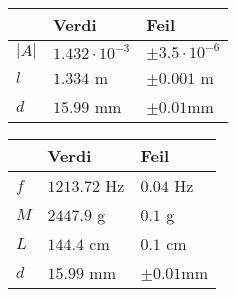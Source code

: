 \documentclass{article}
\begin{document}
\begin{table}
	\center 
	\begin{tabular}{|l|l|l|}
	  \hline
	   & Verdi & Feil \\ \hline
	  $|A|$ & $1.432\cdot10^{-3}$ & $\pm 3.5\cdot10^{-6}$ \\ \hline
	  $l$ & $1.334$ m & $\pm 0.001$ m \\ \hline
	  $d$ & $15.99$ mm & $\pm 0.01$mm \\ \hline
	\end{tabular}	
\end{table}	

\begin{table}
	\center
	\begin{tabular}{|l|l|l|}
	  \hline
	   & Verdi & Feil \\ \hline
	  $f$ & $1213.72$ Hz & $0.04$ Hz \\ \hline
	  $M$ & $2447.9$ g & $0.1$ g \\ \hline
	  $L$ & $144.4$ cm & $0.1$ cm \\ \hline
	  $d$ & $15.99$ mm & $\pm 0.01$mm \\ \hline
	\end{tabular}		
\end{table}
\end{document}
